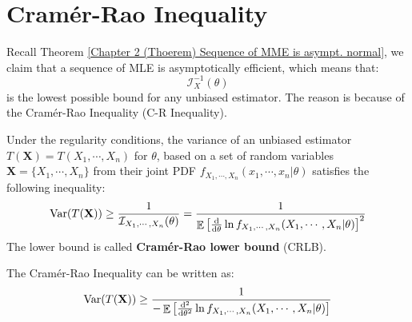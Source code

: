 \documentclass{huhtakm-template-book-v2}
\DeclareMathOperator{\E}{\mathbb{E}}
\DeclareMathOperator{\Var}{Var}
\begin{document}
\section{Cram\'er-Rao Inequality}
Recall Theorem \ref{Chapter 2 (Thoerem) Sequence of MME is asympt. normal}, we claim that a sequence of MLE is asymptotically efficient, which means that:
\begin{equation*}
	\mathcal{I}_{X}^{-1}(\theta)
\end{equation*}
is the lowest possible bound for any unbiased estimator. The reason is because of the Cram\'er-Rao Inequality (C-R Inequality).
\begin{thm}
	Under the regularity conditions, the variance of an unbiased estimator $T(\mathbf{X})=T(X_{1},\cdots,X_{n})$ for $\theta$, based on a set of random variables $\mathbf{X}=\{X_{1},\cdots,X_{n}\}$ from their joint PDF $f_{X_{1},\cdots,X_{n}}(x_{1},\cdots,x_{n}|\theta)$ satisfies the following inequality:
	\begin{equation*}
		\Var(T(\mathbf{X}))\geq\frac{1}{\mathcal{I}_{X_{1},\cdots,X_{n}}(\theta)}=\frac{1}{\E\left[\odv*{\ln{f_{X_{1},\cdots,X_{n}}(X_{1},\cdots,X_{n}|\theta)}}{\theta}\right]^{2}}
	\end{equation*}
	The lower bound is called \textbf{Cram\'er-Rao lower bound} (CRLB).
\end{thm}
\begin{rem}
	The Cram\'er-Rao Inequality can be written as:
	\begin{equation*}
		\Var(T(\mathbf{X}))\geq\frac{1}{-\E\left[\odv*[order={2}]{\ln{f_{X_{1},\cdots,X_{n}}(X_{1},\cdots,X_{n}|\theta)}}{\theta}\right]}
	\end{equation*}
\end{rem}
\end{document}
